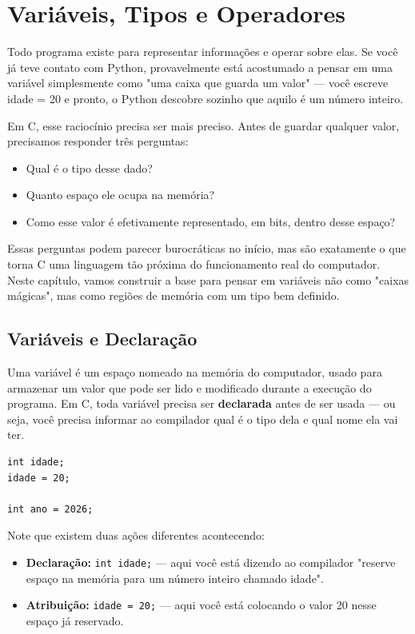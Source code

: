\chapter{Variáveis, Tipos e Operadores}

Todo programa existe para representar informações e operar sobre elas. Se você já teve contato com Python, provavelmente está acostumado a pensar em uma variável simplesmente como "uma caixa que guarda um valor" — você escreve idade = 20 e pronto, o Python descobre sozinho que aquilo é um número inteiro.

Em C, esse raciocínio precisa ser mais preciso. Antes de guardar qualquer valor, precisamos responder três perguntas:

\begin{itemize}
    \item Qual é o tipo desse dado?
    \item Quanto espaço ele ocupa na memória?
    \item Como esse valor é efetivamente representado, em bits, dentro desse espaço?
\end{itemize}

Essas perguntas podem parecer burocráticas no início, mas são exatamente o que torna C uma linguagem tão próxima do funcionamento real do computador. Neste capítulo, vamos construir a base para pensar em variáveis não como "caixas mágicas", mas como regiões de memória com um tipo bem definido.

\section{Variáveis e Declaração}

Uma variável é um espaço nomeado na memória do computador, usado para armazenar um valor que pode ser lido e modificado durante a execução do programa. Em C, toda variável precisa ser \textbf{declarada} antes de ser usada — ou seja, você precisa informar ao compilador qual é o tipo dela e qual nome ela vai ter.

\begin{lstlisting}
int idade;
idade = 20;

int ano = 2026;
\end{lstlisting}

Note que existem duas ações diferentes acontecendo:

\begin{itemize}

    \item \textbf{Declaração:} \texttt{int idade;} — aqui você está dizendo ao compilador "reserve espaço na memória para um número inteiro chamado idade".
    \item \textbf{Atribuição:} \texttt{idade = 20;} — aqui você está colocando o valor 20 nesse espaço já reservado.

\end{itemize}

